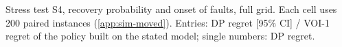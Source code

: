 \begin{table}[!htbp]
\centering
\caption{Stress test S4, recovery probability and onset of faults, full grid. Each cell uses 200 paired instances (\cref{app:sim-moved}). Entries: DP regret [95\% CI] / VOI-1 regret of the policy built on the stated model; single numbers: DP regret.}
\label{tab:s4-full}
\scriptsize
\setlength{\tabcolsep}{3pt}
\resizebox{\linewidth}{!}{}
\end{table}
